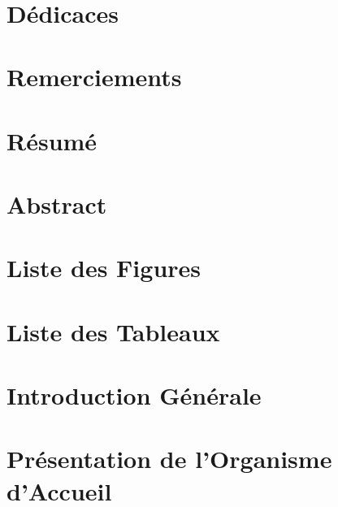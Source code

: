 \documentclass[a4paper,11pt,oneside]{report}
\begin{document}
\makeatother

\newpage

\ \newline

\newpage

\chapter*{Dédicaces}

\newpage

\chapter*{Remerciements}

\newpage

\chapter*{Résumé}

\newpage

\chapter*{Abstract}

\newpage

\tableofcontents

\newpage

\chapter*{Liste des Figures}

\newpage

\chapter*{Liste des Tableaux}

\newpage

\chapter*{Introduction Générale}

\newpage

\chapter{Présentation de l'Organisme d'Accueil}

\newpage
\end{document}
